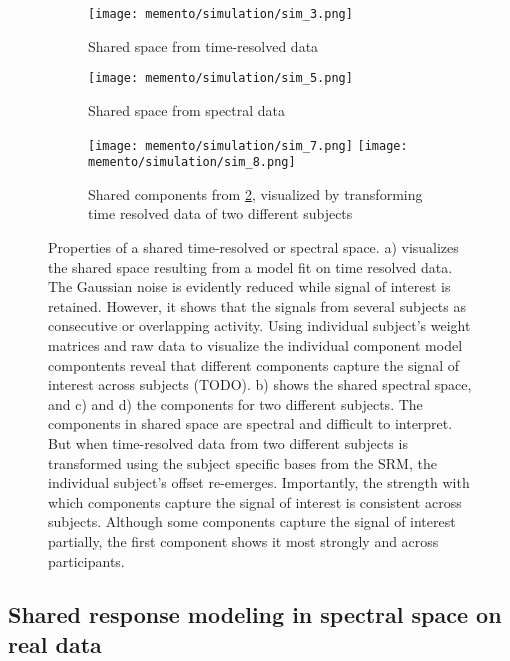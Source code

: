 \begin{figure}
	\centering
	\begin{subfigure}{.49\textwidth}
		\texttt{[image: memento/simulation/sim\_3.png]}
		\caption{Shared space from time-resolved data}
		\label{fig:sim-timeresolved-shared}
	\end{subfigure}
	\begin{subfigure}{.49\textwidth}
		\texttt{[image: memento/simulation/sim\_5.png]}
		\caption{Shared space from spectral data}
		\label{fig:sim-spectral-shared}
	\end{subfigure}
	\hfill
	\begin{subfigure}{1.\textwidth}
		\texttt{[image: memento/simulation/sim\_7.png]}
		\texttt{[image: memento/simulation/sim\_8.png]}
		\caption{Shared components from \ref{fig:sim-spectral-shared}, visualized by transforming time resolved data of two different subjects}
		\label{fig:sim-shared-transformed}
	\end{subfigure}
	\caption[Properties of a shared time-resolved or spectral space]{Properties of a shared time-resolved or spectral space. a) visualizes the shared space resulting from a model fit on time resolved data. The Gaussian noise is evidently reduced while signal of interest is retained. However, it shows that the signals from several subjects as consecutive or overlapping activity. Using individual subject's weight matrices and raw data to visualize the individual component model compontents reveal that different components capture the signal of interest across subjects (TODO). b) shows the shared spectral space, and c) and d) the components for two different subjects. The components in shared space are spectral and difficult to interpret. But when time-resolved data from two different subjects is transformed using the subject specific bases from the \gls{SRM}, the individual subject's offset re-emerges. Importantly, the strength with which components capture the signal of interest is consistent across subjects. Although some components capture the signal of interest partially, the first component shows it most strongly and across participants.}
	\label{fig:sim-spectral}
\end{figure}




\subsection{Shared response modeling in spectral space on real data}


